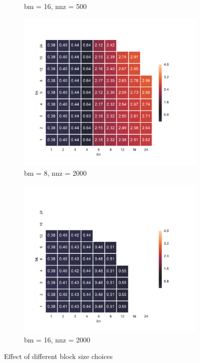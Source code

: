 \begin{figure}[!htb]
\begin{subfigure}[b]{0.45\textwidth}
      \caption{bm = 16, nnz = 500}
    \end{subfigure}
    \begin{subfigure}[b]{0.45\textwidth}
      \centering
      \includegraphics[width=\textwidth]{images/unrolled_sizing_2000_8.pdf}
      \caption{bm = 8, nnz = 2000}
    \end{subfigure}
    \begin{subfigure}[b]{0.45\textwidth}
      \centering
      \includegraphics[width=\textwidth]{images/unrolled_sizing_2000_16.pdf}
      \caption{bm = 16, nnz = 2000}
    \end{subfigure}
    \caption{Effect of different block size choices}
    \label{fig:unrolled_sizing}
  \end{figure}


